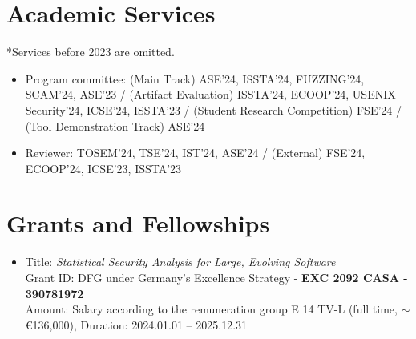 \documentclass[letterpaper,10pt]{article}
\newcommand{\resumeSubHeadingListEnd}{\end{itemize}}
\begin{document}


\section{Academic Services}
*Services before 2023 are omitted.
\begin{itemize}
  \item Program committee: (Main Track) ASE'24, ISSTA'24, FUZZING'24, SCAM'24, ASE'23 / (Artifact Evaluation) ISSTA'24, ECOOP'24, USENIX Security'24, ICSE'24, ISSTA'23 / (Student Research Competition) FSE'24 / (Tool Demonstration Track) ASE'24
  \item Reviewer: TOSEM'24, TSE'24, IST'24, ASE'24 / (External) FSE'24, ECOOP'24, ICSE'23, ISSTA'23
\end{itemize}


\section{Grants and Fellowships}
\begin{itemize}
  \item Title: \emph{Statistical Security Analysis for Large, Evolving Software} \\ 
  Grant ID: DFG under Germany's Excellence Strategy - \textbf{EXC 2092 CASA - 390781972} \\ 
  Amount: Salary according to the remuneration group E 14 TV-L (full time, $\sim$ \euro{136,000}), Duration: 2024.01.01 -- 2025.12.31
\end{itemize}
\end{document}
